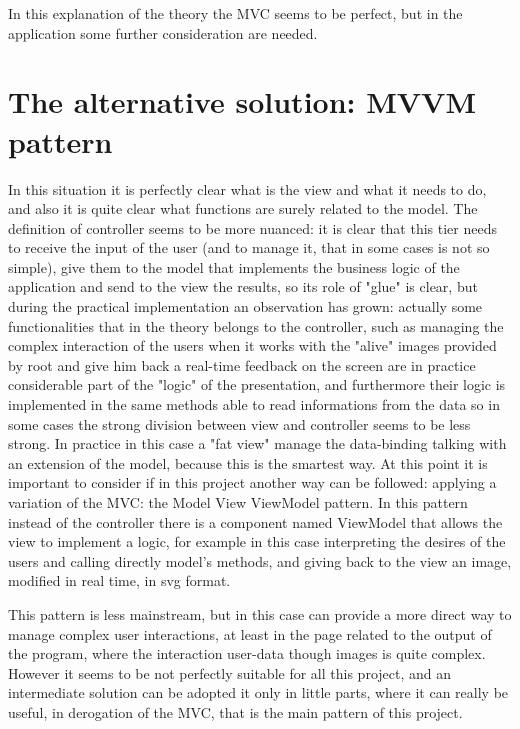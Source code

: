 In this explanation of the theory the MVC seems to be perfect, but in the application some further consideration are needed.

\section{The alternative solution: MVVM pattern}

In this situation it is perfectly clear what is the view and what it needs to do, and also it is quite clear what functions are surely related to the model. The definition of controller seems to be more nuanced: it is clear that this tier needs to receive the input of the user (and to manage it, that in some cases is not so simple), give them to the model that implements the business logic of the application and send to the view the results, so its role of "glue" is clear, but during the practical implementation an observation has grown: actually some functionalities that in the theory belongs to the controller, such as managing the complex interaction of the users when it works with the "alive" images provided by root and give him back a real-time feedback on the screen are in practice considerable part of the "logic" of the presentation, and furthermore their logic is implemented in the same methods able to read informations from the data so in some cases the strong division between view and controller seems to be less strong. 
In practice in this case a "fat view" manage the data-binding talking with an extension of the model, because this is the smartest way. 
At this point it is important to consider if in this project another way can be followed: applying a variation of the MVC: the Model View ViewModel pattern. 
In this pattern instead of the controller there is a component named ViewModel that allows the view to implement a logic, for example in this case interpreting the desires of the users and calling directly model's methods, and giving back to the view an image, modified in real time, in svg format. 

This pattern is less mainstream, but in this case can provide a more direct way to manage complex user interactions, at least in the page related to the output of the program, where the interaction user-data though images is quite complex. 
However it seems to be not perfectly suitable for all this project, and an intermediate solution can be adopted it only in little parts, where it can really be useful, in derogation of the MVC, that is the main pattern of this project.



